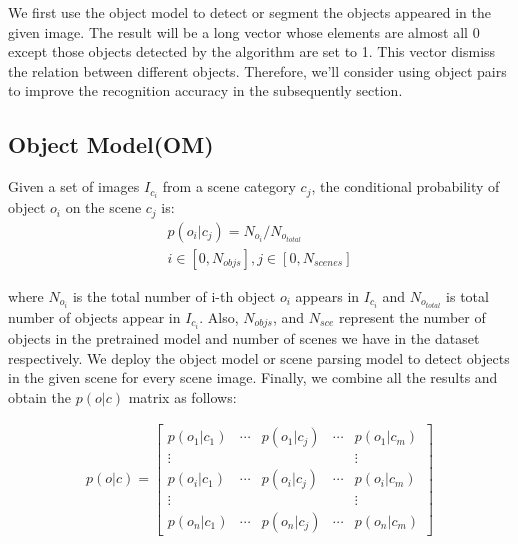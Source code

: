 We first use the object model to detect or segment the objects appeared in the given image. The result will be a long vector whose elements are almost all 0 except those objects detected by the algorithm are set to 1. This vector dismiss the relation between different objects. Therefore, we'll consider using object pairs to improve the recognition accuracy in the subsequently section.

\subsection{\textbf{Object Model(OM)}}


Given a set of images $I_{c_i}$ from a scene category $c_j$, the conditional probability of object $o_i$ on the scene $c_j$ is:
\begin{equation}
\begin{split}
p\left(o_{i} | c_{j}\right) = N_{o_i} / N_{o_{total}} \\
i \in [0,N_{objs}], j \in [0,N_{scenes}]
\end{split}
\end{equation}

where $N_{o_i}$ is the total number of i-th object $o_i$ appears in $I_{c_i}$ and $N_{o_{total}}$ is total number of objects appear in $I_{c_i}$. Also, $N_{objs}$, and $N_{sce}$ represent the number of objects in the pretrained model and number of scenes we have in the dataset respectively. We deploy the object model or scene parsing model to detect objects in the given scene for every scene image. Finally, we combine all the results and obtain the $p(o|c)$ matrix as follows:

\begin{equation}
\begin{split}
p\left(o | c\right) =
\begin{bmatrix}
p\left(o_{1} | c_{1}\right) & \cdots & p\left(o_{1} | c_{j}\right) & \cdots & p\left(o_{1} | c_{m}\right) \\
\vdots &  &  &  & \vdots \\
p\left(o_{i} | c_{1}\right) & \cdots & p\left(o_{i} | c_{j}\right) & \cdots & p\left(o_{i} | c_{m}\right) \\
\vdots &  &  &  & \vdots \\
p\left(o_{n} | c_{1}\right) & \cdots & p\left(o_{n} | c_{j}\right) & \cdots  & p\left(o_{n} | c_{m}\right)
\end{bmatrix}
\end{split}
\end{equation}



